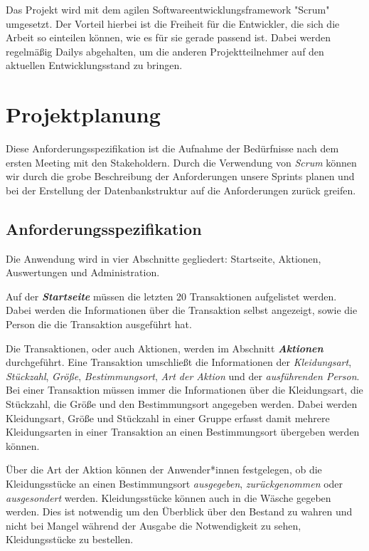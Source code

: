 \newpage

Das Projekt wird mit dem agilen Softwareentwicklungsframework "Scrum" umgesetzt. Der Vorteil hierbei ist die Freiheit für die Entwickler, die sich die Arbeit so einteilen können, wie es für sie gerade passend ist. Dabei werden regelmäßig Dailys abgehalten, um die anderen Projektteilnehmer auf den aktuellen Entwicklungsstand zu bringen.

\section{Projektplanung}\label{sec:Projektplanung}

Diese Anforderungsspezifikation ist die Aufnahme der Bedürfnisse nach dem ersten Meeting mit den Stakeholdern. Durch die Verwendung von \textit{Scrum} können wir durch die grobe Beschreibung der Anforderungen unsere Sprints planen und bei der Erstellung der Datenbankstruktur auf die Anforderungen zurück greifen. 


\subsection{Anforderungsspezifikation}

Die Anwendung wird in vier Abschnitte gegliedert: Startseite, Aktionen, Auswertungen und Administration.

Auf der \textit{\textbf{Startseite}} müssen die letzten 20 Transaktionen aufgelistet werden. Dabei werden die Informationen über die Transaktion selbst angezeigt, sowie die Person die die Transaktion ausgeführt hat.

Die Transaktionen, oder auch Aktionen, werden im Abschnitt \textit{\textbf{Aktionen}} durchgeführt. Eine Transaktion umschließt die Informationen der \textit{Kleidungsart}, \textit{Stückzahl}, \textit{Größe}, \textit{Bestimmungsort}, \textit{Art der Aktion} und der \textit{ausführenden Person}. Bei einer Transaktion müssen immer die Informationen über die Kleidungsart, die Stückzahl, die Größe und den Bestimmungsort angegeben werden. Dabei werden Kleidungsart, Größe und Stückzahl in einer Gruppe erfasst damit mehrere Kleidungsarten in einer Transaktion an einen Bestimmungsort übergeben werden können. 

Über die Art der Aktion können der Anwender*innen festgelegen, ob die Kleidungsstücke an einen Bestimmungsort \textit{ausgegeben}, \textit{zurückgenommen} oder \textit{ausgesondert} werden. Kleidungsstücke können auch in die Wäsche gegeben werden. Dies ist notwendig um den Überblick über den Bestand zu wahren und nicht bei Mangel während der Ausgabe die Notwendigkeit zu sehen, Kleidungsstücke zu bestellen.

